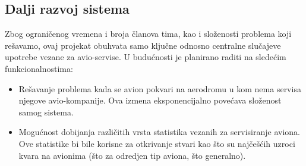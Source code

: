 \documentclass[a4paper]{article}
\begin{document}
\subsection{Dalji razvoj sistema}
\label{subsec:dalji_razvoj}

Zbog ograničenog vremena i broja članova tima, kao i složenosti problema koji rešavamo, ovaj projekat obuhvata samo ključne odnosno centralne slučajeve upotrebe vezane za avio-servise. U budućnosti je planirano raditi na sledećim funkcionalnostima:
\begin{itemize}
    \item Rešavanje problema kada se avion pokvari na aerodromu u kom nema servisa njegove avio-kompanije. Ova izmena eksponencijalno povećava složenost samog sistema.
    \item Mogućnost dobijanja različitih vrsta statistika vezanih za servisiranje aviona. Ove statistike bi bile korisne za otkrivanje stvari kao što su najčešćih uzroci kvara na avionima (što za odredjen tip aviona, što generalno).
\end{itemize}
\end{document}
